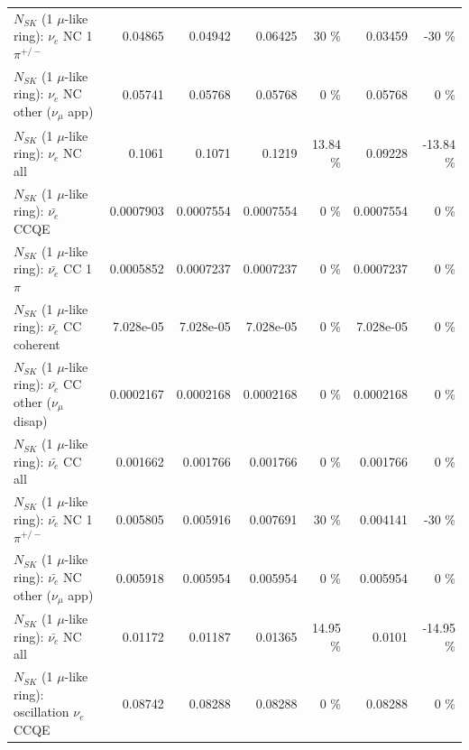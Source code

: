 \begin{table}
\begin{tabular}{| l | r | r | r  r | r  r |}
\hline
                           $N_{SK}$ (1 $\mu$-like ring): $\nu_e$ NC 1$\pi^{+/-}$ &         0.04865 &         0.04942 &         0.06425 &       30 \%  &         0.03459 &      -30 \%  \\ 
                  $N_{SK}$ (1 $\mu$-like ring): $\nu_e$ NC other ($\nu_\mu$ app) &         0.05741 &         0.05768 &         0.05768 &        0 \%  &         0.05768 &        0 \%  \\ 
                                  $N_{SK}$ (1 $\mu$-like ring): $\nu_{e}$ NC all &          0.1061 &          0.1071 &          0.1219 &    13.84 \%  &         0.09228 &   -13.84 \%  \\ 
\hline
\hline
\hline
                                $N_{SK}$ (1 $\mu$-like ring): $\bar{\nu_e}$ CCQE &       0.0007903 &       0.0007554 &       0.0007554 &        0 \%  &       0.0007554 &        0 \%  \\ 
                           $N_{SK}$ (1 $\mu$-like ring): $\bar{\nu_e}$ CC 1$\pi$ &       0.0005852 &       0.0007237 &       0.0007237 &        0 \%  &       0.0007237 &        0 \%  \\ 
                         $N_{SK}$ (1 $\mu$-like ring): $\bar{\nu_e}$ CC coherent &       7.028e-05 &       7.028e-05 &       7.028e-05 &        0 \%  &       7.028e-05 &        0 \%  \\ 
          $N_{SK}$ (1 $\mu$-like ring): $\bar{\nu_e}$ CC other ($\nu_\mu$ disap) &       0.0002167 &       0.0002168 &       0.0002168 &        0 \%  &       0.0002168 &        0 \%  \\ 
                            $N_{SK}$ (1 $\mu$-like ring): $\bar{\nu_{e}}$ CC all &        0.001662 &        0.001766 &        0.001766 &        0 \%  &        0.001766 &        0 \%  \\ 
\hline
                     $N_{SK}$ (1 $\mu$-like ring): $\bar{\nu_e}$ NC 1$\pi^{+/-}$ &        0.005805 &        0.005916 &        0.007691 &       30 \%  &        0.004141 &      -30 \%  \\ 
            $N_{SK}$ (1 $\mu$-like ring): $\bar{\nu_e}$ NC other ($\nu_\mu$ app) &        0.005918 &        0.005954 &        0.005954 &        0 \%  &        0.005954 &        0 \%  \\ 
                            $N_{SK}$ (1 $\mu$-like ring): $\bar{\nu_{e}}$ NC all &         0.01172 &         0.01187 &         0.01365 &    14.95 \%  &          0.0101 &   -14.95 \%  \\ 
\hline
\hline
\hline
                          $N_{SK}$ (1 $\mu$-like ring): oscillation $\nu_e$ CCQE &         0.08742 &         0.08288 &         0.08288 &        0 \%  &         0.08288 &        0 \%  \\ 

\end{tabular}
\end{table}
